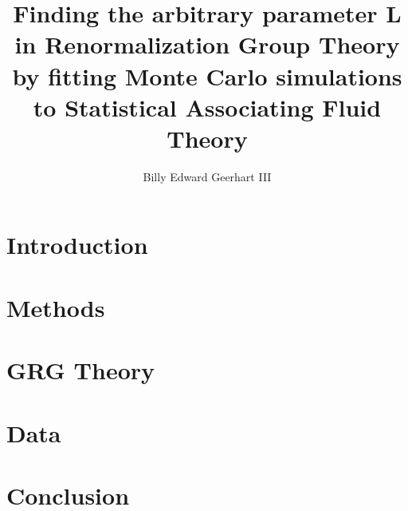 \documentclass[12pt,twoside]{report}
\title{Finding the arbitrary parameter L in Renormalization Group Theory by fitting Monte Carlo simulations to Statistical Associating Fluid Theory}
\author{Billy Edward Geerhart III}
\begin{document}






\tableofcontents

\listoffigures

\chapter{Introduction}


\chapter{Methods}


\chapter{GRG Theory}


\chapter{Data}


\chapter{Conclusion}



\end{document}
